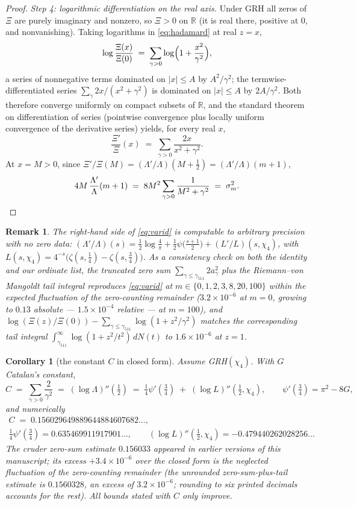 \documentclass[11pt]{article}
\newtheorem{corollary}{Corollary}
\newtheorem{remark}{Remark}
\begin{document}
\begin{proof}
\emph{Step 4: logarithmic differentiation on the real axis.} Under GRH
all zeros of $\Xi$ are purely imaginary and nonzero, so $\Xi>0$ on
$\mathbb R$ (it is real there, positive at $0$, and nonvanishing).
Taking logarithms in \eqref{eq:hadamard} at real $z=x$,
\[
\log\frac{\Xi(x)}{\Xi(0)}\;=\;\sum_{\gamma>0}
\log\Bigl(1+\frac{x^2}{\gamma^2}\Bigr),
\]
a series of nonnegative terms dominated on $|x|\le A$ by
$A^2/\gamma^2$; the termwise-differentiated series
$\sum_\gamma 2x/(x^2+\gamma^2)$ is dominated on $|x|\le A$ by
$2A/\gamma^2$. Both therefore converge uniformly on compact subsets of
$\mathbb R$, and the standard theorem on differentiation of series
(pointwise convergence plus locally uniform convergence of the
derivative series) yields, for every real $x$,
\[
\frac{\Xi'}{\Xi}(x)\;=\;\sum_{\gamma>0}\frac{2x}{x^2+\gamma^2}.
\]
At $x=M>0$, since $\Xi'/\Xi(M)=(\Lambda'/\Lambda)(M+\tfrac12)
=(\Lambda'/\Lambda)(m+1)$,
\[
4M\,\frac{\Lambda'}{\Lambda}(m+1)
\;=\;8M^2\sum_{\gamma>0}\frac1{M^2+\gamma^2}\;=\;\sigma_m^2. \qedhere
\]
\end{proof}

\begin{remark}\label{rem:varid-numerics}
The right-hand side of \eqref{eq:varid} is computable to arbitrary
precision with \emph{no} zero data:
$(\Lambda'/\Lambda)(s)=\tfrac12\log\tfrac4\pi
+\tfrac12\psi\bigl(\tfrac{s+1}2\bigr)+(L'/L)(s,\chi_4)$, with
$L(s,\chi_4)=4^{-s}\bigl(\zeta(s,\tfrac14)-\zeta(s,\tfrac34)\bigr)$.
As a consistency check on both the identity and our ordinate list, the
truncated zero sum $\sum_{\gamma\le\gamma_{511}}2a_\gamma^2$ plus the
Riemann--von Mangoldt tail integral reproduces \eqref{eq:varid} at
$m\in\{0,1,2,3,8,20,100\}$ within the expected fluctuation of the
zero-counting remainder ($3.2\times10^{-6}$ at $m=0$, growing to
$0.13$ absolute --- $1.5\times10^{-4}$ relative --- at $m=100$), and
$\log(\Xi(z)/\Xi(0))-\sum_{\gamma\le\gamma_{511}}\log(1+z^2/\gamma^2)$
matches the corresponding tail integral
$\int_{\gamma_{511}}^\infty\log(1+z^2/t^2)\,dN(t)$ to
$1.6\times10^{-6}$ at $z=1$.
\end{remark}

\begin{corollary}[the constant $C$ in closed form]\label{cor:Cexact}
Assume GRH$(\chi_4)$. With $G$ Catalan's constant,
\[
C\;=\;\sum_{\gamma>0}\frac{2}{\gamma^2}
\;=\;(\log\Lambda)''(\tfrac12)
\;=\;\tfrac14\psi'(\tfrac34)\;+\;(\log L)''(\tfrac12,\chi_4),
\qquad
\psi'(\tfrac34)=\pi^2-8G,
\]
and numerically
\begin{gather*}
C\;=\;0.156029649889644884607682\ldots,\\
\tfrac14\psi'(\tfrac34)=0.635469911917901\ldots,\qquad
(\log L)''(\tfrac12,\chi_4)=-0.479440262028256\ldots
\end{gather*}
The cruder zero-sum estimate $0.156033$ appeared in earlier versions
of this manuscript; its excess $+3.4\times10^{-6}$ over the closed
form is the neglected fluctuation of the zero-counting remainder (the
unrounded zero-sum-plus-tail estimate is $0.1560328$, an excess of
$3.2\times10^{-6}$; rounding to six printed decimals accounts for the
rest). All bounds stated with $C$ only improve.
\end{corollary}
\end{document}
